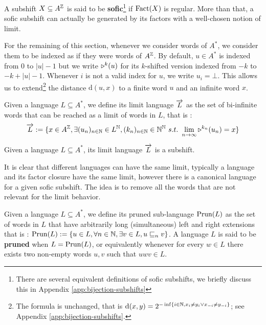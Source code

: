 A subshift $X \subseteq A^{\mathbb{Z}}$ is said to be \textbf{sofic}\footnote{There are several equivalent definitions of sofic subshifts, we briefly discuss this in Appendix \ref{app:bijection-subshifts}} if $\mathrm{Fact}(X)$ is regular. 
More than that, a sofic subshift can actually be generated by its factors with a well-chosen notion of limit.

For the remaining of this section, whenever we consider words of $A^*$, we consider them to be indexed as if they were words of $A^{\mathbb{Z}}$.
By default, $u \in A^*$ is indexed from $0$ to $|u|-1$ but we write $\shift{k}{}(u)$ for its $k$-shifted version indexed from $-k$ to $-k+|u|-1$. %
Whenever $i$ is not a valid index for $u$, we write $u_i = \bot$.
This allows us to extend\footnote{The formula is unchanged, that is $\mathrm{d}(x,y) = 2^{-\inf\{i \in  {\mathbb{N}}, x_i\neq y_i \vee x_{-i} \neq y_{-i}\}}$; see Appendix \ref{app:bijection-subshifts}.} the distance $\mathrm{d}(u,x)$ to a finite word $u$ and an infinite word $x$.

\begin{definition}
	Given a language $L\subseteq A^*$, we define its limit language $\overrightarrow{L}$ as the set of bi-infinite words that can be reached as a limit of words in $L$, that is :
	\[ \limlang{L} := \{ x \in A^{\mathbb{Z}}, \exists (u_n)_{n\in \mathbb{N}} \in L^{\mathbb{N}}, (k_n)_{n\in \mathbb{N}} \in \mathbb{N}^{\mathbb{N}}\ s.t.\ \lim\limits_{n\to \infty} \shift{k_n}{}(u_n) = x\}\] 
\end{definition}

\begin{lemma}\label{lem:limlang-is-subshift}
	Given a language $L\subseteq A^*$, its limit language $\overrightarrow{L}$ is a subshift. %
\end{lemma}

It is clear that different languages can have the same limit, typically a language and its factor closure have the same limit,
however there is a canonical language for a given sofic subshift.
The idea is to remove all the words that are not relevant for the limit behavior.

\begin{definition}
Given a language $L\subseteq A^*$, we define its pruned sub-language $\mathrm{Prun}(L)$ as the set of words in $L$ that have arbitrarily long (simultaneous) left and right extensions that is : $\mathrm{Prun}(L) := \{ u \in L, \forall n \in \mathbb{N}, \exists v \in L, u \sqsubseteq_{n} v\}$.
A language $L$ is said to be \textbf{pruned} when $L=\mathrm{Prun}(L)$, or equivalently whenever for every $w \in L$ there exists two non-empty words $u,v$ such that $uwv \in L$.
\end{definition}

